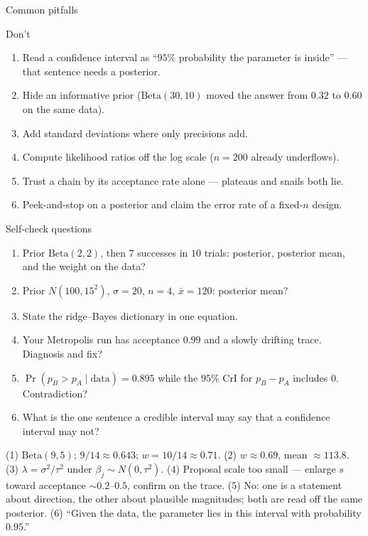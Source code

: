 \documentclass[aspectratio=169,11pt]{beamer}
\begin{document}
\begin{frame}{Common pitfalls}
  \begin{alertblock}{Don't}
    \begin{enumerate}
      \item Read a confidence interval as ``$95\%$ probability the parameter is
            inside'' --- that sentence needs a posterior.
      \item Hide an informative prior ($\text{Beta}(30,10)$ moved the answer from
            $0.32$ to $0.60$ on the same data).
      \item Add standard deviations where only precisions add.
      \item Compute likelihood ratios off the log scale ($n = 200$ already
            underflows).
      \item Trust a chain by its acceptance rate alone --- plateaus and snails
            both lie.
      \item Peek-and-stop on a posterior and claim the error rate of a fixed-$n$
            design.
    \end{enumerate}
  \end{alertblock}
\end{frame}

\begin{frame}{Self-check questions}
  \scriptsize
  \begin{readme}
    \begin{enumerate}
      \item Prior $\text{Beta}(2,2)$, then $7$ successes in $10$ trials: posterior,
            posterior mean, and the weight on the data?
      \item Prior $N(100, 15^2)$, $\sigma = 20$, $n = 4$, $\bar x = 120$: posterior
            mean?
      \item State the ridge--Bayes dictionary in one equation.
      \item Your Metropolis run has acceptance $0.99$ and a slowly drifting trace.
            Diagnosis and fix?
      \item $\Pr(p_B > p_A \mid \text{data}) = 0.895$ while the $95\%$ CrI for
            $p_B - p_A$ includes $0$. Contradiction?
      \item What is the one sentence a credible interval may say that a confidence
            interval may not?
    \end{enumerate}
  \end{readme}
  \begin{takeaway}[{{Answers}}]
    (1) $\text{Beta}(9,5)$; $9/14 \approx 0.643$; $w = 10/14 \approx 0.71$.
    (2) $w \approx 0.69$, mean $\approx 113.8$. (3) $\lambda = \sigma^2/\tau^2$
    under $\beta_j \sim N(0, \tau^2)$. (4) Proposal scale too small --- enlarge
    $s$ toward acceptance $\sim 0.2$--$0.5$, confirm on the trace. (5) No: one is
    a statement about direction, the other about plausible magnitudes; both are
    read off the same posterior. (6) ``Given the data, the parameter lies in this
    interval with probability $0.95$.''
  \end{takeaway}
\end{frame}
\end{document}

